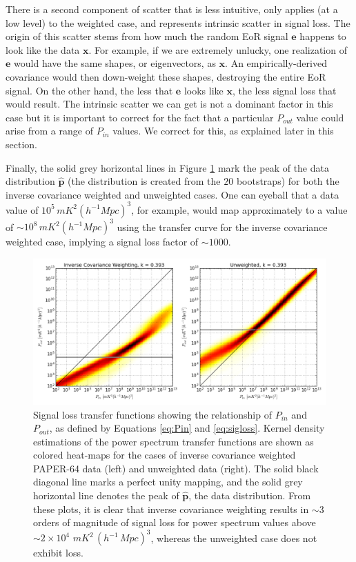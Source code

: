 \documentclass[preprint2,numberedappendix,tighten]{aastex6}  %
\begin{document}
There is a second component of scatter that is less intuitive, only applies (at a low level) to the weighted case, and represents intrinsic scatter in signal loss. The origin of this scatter stems from how much the random EoR signal $\textbf{e}$ happens to look like the data $\textbf{x}$. For example, if we are extremely unlucky, one realization of $\textbf{e}$ would have the same shapes, or eigenvectors, as $\textbf{x}$. An empirically-derived covariance would then down-weight these shapes, destroying the entire EoR signal. On the other hand, the less that $\textbf{e}$ looks like $\textbf{x}$, the less signal loss that would result. The intrinsic scatter we can get is not a dominant factor in this case but it is important to correct for the fact that a particular $P_{out}$ value could arise from a range of $P_{in}$ values. We correct for this, as explained later in this section.

Finally, the solid grey horizontal lines in Figure \ref{fig:sigloss_transfercurve} mark the peak of the data distribution $\hat{\textbf{p}}$ (the distribution is created from the $20$ bootstraps) for both the inverse covariance weighted and unweighted cases. One can eyeball that a data value of $10^{5} \, mK^{2} (h^{-1} Mpc)^{3}$, for example, would map approximately to a value of $\sim10^{8} \, mK^{2} (h^{-1} Mpc)^{3}$ using the transfer curve for the inverse covariance weighted case, implying a signal loss factor of $\sim1000$. 

\begin{figure}
	\centering
	\includegraphics[width=1\textwidth]{plots/sigloss_transfercurve.png}
	\caption{Signal loss transfer functions showing the relationship of $P_{in}$ and $P_{out}$, as defined by Equations \eqref{eq:Pin} and \eqref{eq:sigloss}. Kernel density estimations of the power spectrum transfer functions are shown as colored heat-maps for the cases of inverse covariance weighted PAPER-64 data (left) and unweighted data (right). The solid black diagonal line marks a perfect unity mapping, and the solid grey horizontal line denotes the peak of $\hat{\textbf{p}}$, the data distribution. From these plots, it is clear that inverse covariance weighting results in $\sim3$ orders of magnitude of signal loss for power spectrum values above $\sim$$2 \times 10^{4}$ $mK^{2} \, (h^{-1} \, Mpc)^{3}$, whereas the unweighted case does not exhibit loss.}
	\label{fig:sigloss_transfercurve}
\end{figure}
\end{document}
